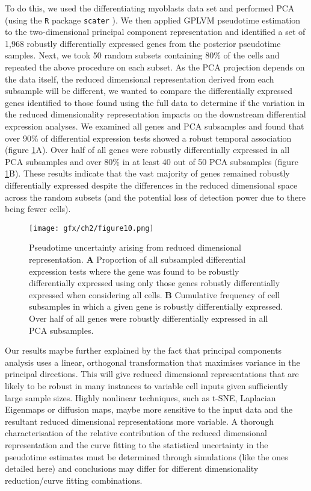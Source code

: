To do this, we used the differentiating myoblasts data set \cite{Trapnell2014-xi} and performed PCA (using the \texttt{R} package \texttt{scater} \cite{McCarthy2017-we}). We then applied GPLVM pseudotime estimation to the two-dimensional principal component representation and identified a set of 1,968 robustly differentially expressed genes from the posterior pseudotime samples. Next, we took 50 random subsets containing 80\% of the cells and repeated the above procedure on each subset. As the PCA projection depends on the data itself, the reduced dimensional representation derived from each subsample will be different, we wanted to compare the differentially expressed genes identified to those found using the full data to determine if the variation in the reduced dimensionality representation impacts on the downstream differential expression analyses. We examined all genes and PCA subsamples and found that over 90\% of differential expression tests showed a robust temporal association (figure \ref{fig:pca_compare}A). Over half of all genes were robustly differentially expressed in all PCA subsamples and over 80\% in at least 40 out of 50 PCA subsamples (figure \ref{fig:pca_compare}B). These results indicate that the vast majority of genes remained robustly differentially expressed despite the differences in the reduced dimensional space across the random subsets (and the potential loss of detection power due to there being fewer cells).

\begin{figure}
\centering
	\texttt{[image: gfx/ch2/figure10.png]}
\caption{ Pseudotime uncertainty arising from reduced dimensional representation.
\textbf{A} Proportion of all subsampled differential expression tests where the gene was found to be robustly differentially expressed using only those genes robustly differentially expressed when considering all cells. %
\textbf{B} Cumulative frequency of cell subsamples in which a given gene is robustly differentially expressed. Over half of all genes were robustly differentially expressed in all PCA subsamples.} \label{fig:pca_compare}
\end{figure}

Our results maybe further explained by the fact that principal components analysis uses a linear, orthogonal transformation that maximises variance in the principal directions. This will give reduced dimensional representations that are likely to be robust in many instances to variable cell inputs given sufficiently large sample sizes. Highly nonlinear techniques, such as t-SNE, Laplacian Eigenmaps or diffusion maps, maybe more sensitive to the input data and the resultant reduced dimensional representations more variable. A thorough characterisation of the relative contribution of the reduced dimensional representation and the curve fitting to the statistical uncertainty in the pseudotime estimates must be determined through simulations (like the ones detailed here) and conclusions may differ for different dimensionality reduction/curve fitting combinations.

